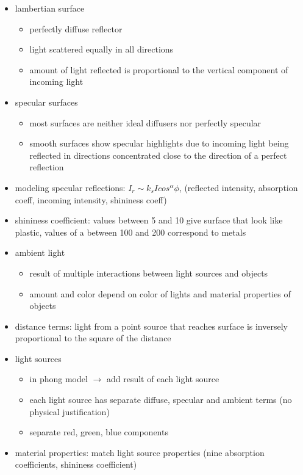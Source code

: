 \documentclass[11pt,a4paper]{article}
\begin{document}
\begin{itemize}
\begin{itemize}
	\end{itemize}
	\item lambertian surface
	\begin{itemize}
		\item perfectly diffuse reflector
		\item light scattered equally in all directions
		\item amount of light reflected is proportional to the vertical component of incoming light
	\end{itemize}
	\item specular surfaces
	\begin{itemize}
		\item most surfaces are neither ideal diffusers nor perfectly specular 
		\item smooth surfaces show specular highlights due to incoming light being reflected in directions concentrated close to the direction of a perfect reflection
	\end{itemize}
	\item modeling specular reflections: $I_{r} \sim k_s I cos^{\alpha}\phi$, (reflected intensity, absorption coeff, incoming intensity, shininess coeff)
	\item shininess coefficient:	values between 5 and 10 give surface that look like plastic, values of a between 100 and 200 correspond to metals
	\item ambient light
	\begin{itemize}
		\item result of multiple interactions between light sources and objects
		\item amount and color depend on color of lights and material properties of objects
	\end{itemize}
	\item distance terms: light from a point source that reaches surface is inversely proportional to the square of the distance
	\item light sources
	\begin{itemize}
		\item in phong model $\rightarrow$ add result of each light source
		\item each light source has separate diffuse, specular and ambient terms (no physical justification)
		\item separate red, green, blue components
	\end{itemize}
	\item material properties: match light source properties (nine absorption coefficients, shininess coefficient)

\end{itemize}
\end{document}
